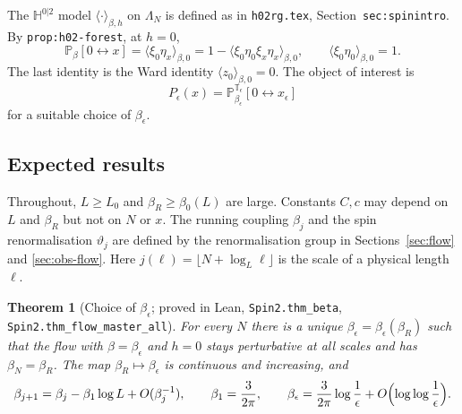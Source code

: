 \documentclass[11pt]{amsart}
\newtheorem{theorem}{Theorem}[section]
\theoremstyle{definition}
\theoremstyle{remark}
\numberwithin{equation}{section}
\newcommand{\bbH}{\mathbb{H}}
\newcommand{\Pb}{\mathbb{P}}
\newcommand{\T}{\mathbb{T}}
\newcommand{\avg}[1]{\langle #1\rangle}
\newcommand{\conn}{\leftrightarrow}
\newcommand{\hr}{\texttt{h02rg.tex}}
\begin{document}
The $\bbH^{0|2}$ model $\avg{\cdot}_{\beta,h}$ on $\Lambda_N$ is defined as in \hr{},
Section~\texttt{sec:spinintro}. By \texttt{prop:h02-forest}, at $h=0$,
\begin{equation}\label{e:P}
  \Pb_\beta[0\conn x]=\avg{\xi_0\eta_x}_{\beta,0}=1-\avg{\xi_0\eta_0\xi_x\eta_x}_{\beta,0},
  \qquad \avg{\xi_0\eta_0}_{\beta,0}=1 .
\end{equation}
The last identity is the Ward identity $\avg{z_0}_{\beta,0}=0$. The object of interest is
\[
  P_\epsilon(x)=\Pb^{\T_\epsilon}_{\beta_\epsilon}[0\conn x_\epsilon]
\]
for a suitable choice of $\beta_\epsilon$.

\subsection{Expected results}
\label{sec:results}
Throughout, $L\ge L_0$ and $\beta_R\ge\beta_0(L)$ are large. Constants $C,c$ may depend on $L$
and $\beta_R$ but not on $N$ or $x$. The running coupling $\beta_j$ and the spin renormalisation
$\vartheta_j$ are defined by the renormalisation group in Sections~\ref{sec:flow} and
\ref{sec:obs-flow}. Here $j(\ell)=\lfloor N+\log_L\ell\rfloor$ is the scale of a physical
length $\ell$.

\begin{theorem}[Choice of $\beta_\epsilon$; proved in Lean, \texttt{Spin2.thm\_beta},
\texttt{Spin2.thm\_flow\_master\_all}]\label{thm:beta}
For every $N$ there is a unique $\beta_\epsilon=\beta_\epsilon(\beta_R)$ such that the flow with
$\beta=\beta_\epsilon$ and $h=0$ stays perturbative at all scales and has $\beta_N=\beta_R$.
The map $\beta_R\mapsto\beta_\epsilon$ is continuous and increasing, and
\[
  \beta_{j+1}=\beta_j-\beta_1\log L+O(\beta_j^{-1}),\qquad\beta_1=\frac3{2\pi},\qquad
  \beta_\epsilon=\frac3{2\pi}\log\frac1\epsilon+O\Bigl(\log\log\frac1\epsilon\Bigr).
\]
\end{theorem}
\end{document}
